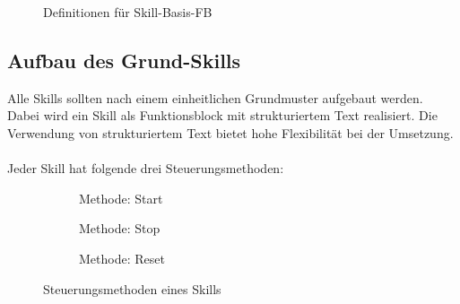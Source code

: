 		\begin{figure}[h!]
			\centering
			\captionsetup{justification=centering}
			\caption{Definitionen für Skill-Basis-FB}
			\label{fig:FB_Basis_Skill}
		\end{figure}
	
	\subsection{Aufbau des Grund-Skills} \label{Grundskill_Aufbau}
		Alle Skills sollten nach einem einheitlichen Grundmuster aufgebaut werden. Dabei wird ein Skill als Funktionsblock mit strukturiertem Text realisiert. Die Verwendung von strukturiertem Text bietet hohe Flexibilität bei der Umsetzung.
		\\
		\\
		Jeder Skill hat folgende drei Steuerungsmethoden: 
		\begin{figure}[h!]
			\centering
			\begin{subfigure}[b]{0.5\textwidth}
				\centering
				\caption{Methode: Start}
				\label{fig:Skill_MStart}
			\end{subfigure}
			\hfill
			\begin{subfigure}[b]{0.2\textwidth}
				\centering
				\caption{Methode: Stop}
				\label{fig:Skill_MStop}
			\end{subfigure}
			\hfill
			\begin{subfigure}[b]{0.2\textwidth}
				\centering
				\caption{Methode: Reset}
				\label{fig:Skill_MReset}
			\end{subfigure}
			\caption{Steuerungsmethoden eines Skills}
			\label{fig:Steuerungsmethoden}
		\end{figure}
		
